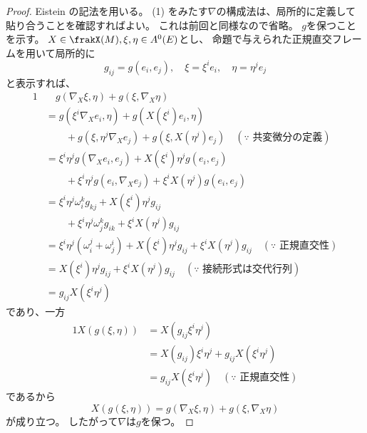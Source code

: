 \documentclass[report]{jlreq}
\begin{document}
\begin{proof}
    Eistein の記法を用いる。
    (1) をみたす$\nabla$の構成法は、局所的に定義して貼り合うことを確認すればよい。
    これは前回と同様なので省略。
    $g$を保つことを示す。
    $X \in \frakX(M), \xi, \eta \in A^0(E)$とし、
    命題で与えられた正規直交フレームを用いて局所的に
    \begin{equation}
        g_{ij} = g(e_i, e_j), \quad
        \xi = \xi^i e_i, \quad
        \eta = \eta^j e_j
    \end{equation}
    と表示すれば、
    \begin{alignat}{1}
        &\quad g(\nabla_X \xi, \eta) + g(\xi, \nabla_X \eta) \\
        &= g(\xi^i \nabla_X e_i, \eta) + g(X(\xi^i) e_i, \eta) \\
        &\qquad + g(\xi, \eta^j \nabla_X e_j) + g(\xi, X(\eta^j) e_j)
            \quad (\text{$\because$ 共変微分の定義}) \\
        &= \xi^i \eta^j g(\nabla_X e_i, e_j) + X(\xi^i) \eta^j g(e_i, e_j) \\
        &\qquad + \xi^i \eta^j g(e_i, \nabla_X e_j) + \xi^i X(\eta^j) g(e_i, e_j) \\
        &= \xi^i \eta^j \omega_i^k g_{kj} + X(\xi^i) \eta^j g_{ij} \\
        &\qquad + \xi^i \eta^j \omega_j^k g_{ik} + \xi^i X(\eta^j) g_{ij} \\
        &= \xi^i \eta^j (\omega_i^j + \omega_j^i)
            + X(\xi^i) \eta^j g_{ij} + \xi^i X(\eta^j) g_{ij}
            \quad (\text{$\because$ 正規直交性}) \\
        &= X(\xi^i) \eta^j g_{ij} + \xi^i X(\eta^j) g_{ij}
            \quad (\text{$\because$ 接続形式は交代行列}) \\
        &= g_{ij} X(\xi^i \eta^j)
    \end{alignat}
    であり、一方
    \begin{alignat}{1}
        X(g(\xi, \eta))
            &= X(g_{ij} \xi^i \eta^j) \\
            &= X(g_{ij}) \xi^i \eta^j
                + g_{ij} X(\xi^i \eta^j) \\
            &= g_{ij} X(\xi^i \eta^j)
                \quad (\text{$\because$ 正規直交性})
    \end{alignat}
    であるから
    \begin{equation}
        X(g(\xi, \eta)) = g(\nabla_X \xi, \eta) + g(\xi, \nabla_X \eta)
    \end{equation}
    が成り立つ。
    したがって$\nabla$は$g$を保つ。
\end{proof}
\end{document}
